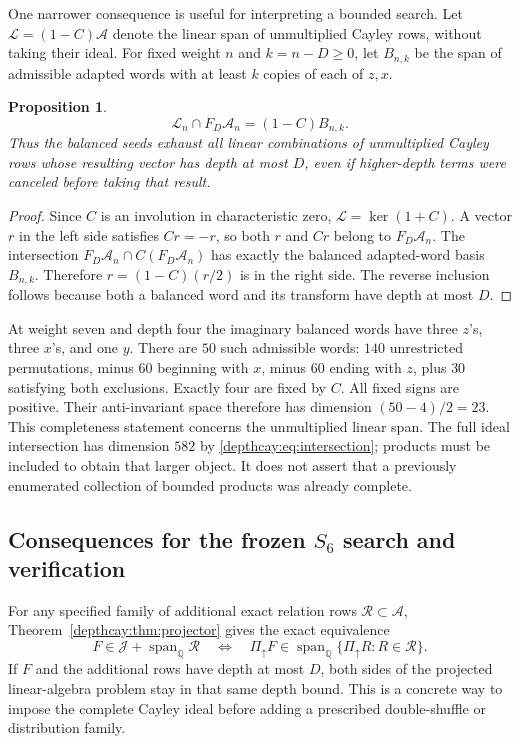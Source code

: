 \documentclass[11pt,a4paper]{article}
\numberwithin{equation}{section}
\newtheorem{proposition}[theorem]{Proposition}
\theoremstyle{definition}
\theoremstyle{remark}
\begin{document}
One narrower consequence is useful for interpreting a bounded search.
Let $\mathcal L=(1-C)\mathcal A$ denote the linear span of unmultiplied
Cayley rows, without taking their ideal. For fixed weight $n$ and
$k=n-D\ge0$, let $B_{n,k}$ be the span of admissible adapted words
with at least $k$ copies of each of $z,x$.

\begin{proposition}\label{depthcay:prop:balanced}
\[
 \mathcal L_n\cap F_D\mathcal A_n=(1-C)B_{n,k}.
\]
Thus the balanced seeds exhaust all linear combinations of unmultiplied
Cayley rows whose resulting vector has depth at most $D$, even if
higher-depth terms were canceled before taking that result.
\end{proposition}
\begin{proof}
Since $C$ is an involution in characteristic zero,
$\mathcal L=\ker(1+C)$. A vector $r$ in the left side satisfies
$Cr=-r$, so both $r$ and $Cr$ belong to $F_D\mathcal A_n$.
The intersection $F_D\mathcal A_n\cap C(F_D\mathcal A_n)$ has
exactly the balanced adapted-word basis $B_{n,k}$. Therefore
$r=(1-C)(r/2)$ is in the right side. The reverse inclusion follows
because both a balanced word and its transform have depth at most $D$.
\end{proof}

At weight seven and depth four the imaginary balanced words have three
$z$'s, three $x$'s, and one $y$. There are $50$ such admissible words:
$140$ unrestricted permutations, minus $60$ beginning with $x$, minus
$60$ ending with $z$, plus $30$ satisfying both exclusions. Exactly
four are fixed by $C$. All fixed signs are positive. Their anti-invariant
space therefore has dimension $(50-4)/2=23$.
This completeness statement concerns the unmultiplied linear span.
The full ideal intersection has dimension $582$ by
\eqref{depthcay:eq:intersection}; products must be included to obtain
that larger object. It does not assert that a previously enumerated
collection of bounded products was already complete.

\subsection{Consequences for the frozen \texorpdfstring{$S_6$}{S6} search and verification}

For any specified family of additional exact relation rows
$\mathscr R\subset\mathcal A$, Theorem~\ref{depthcay:thm:projector}
gives the exact equivalence
\begin{equation}\label{depthcay:eq:combined}
 F\in\mathcal J+\operatorname{span}_{\mathbb Q}\mathscr R
 \quad\Longleftrightarrow\quad
 \Pi_{\uparrow}F\in
 \operatorname{span}_{\mathbb Q}\{\Pi_{\uparrow}R:R\in\mathscr R\}.
\end{equation}
If $F$ and the additional rows have depth at most $D$, both sides of
the projected linear-algebra problem stay in that same depth bound.
This is a concrete way to impose the complete Cayley ideal before
adding a prescribed double-shuffle or distribution family.
\end{document}
